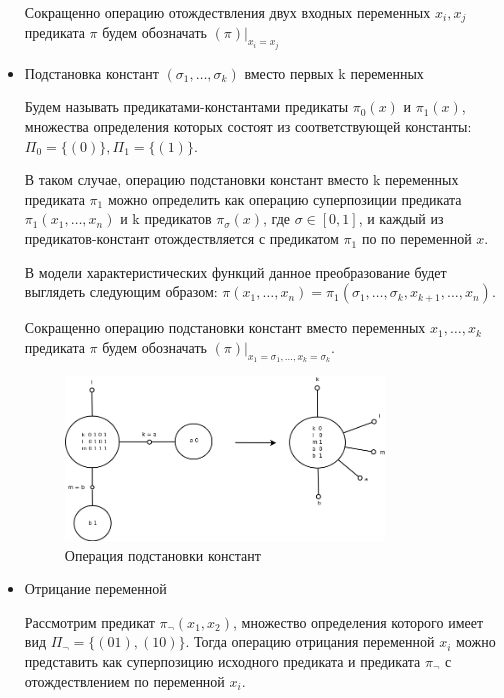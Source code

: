 \documentclass[12pt]{article}
\begin{document}
\begin{itemize}
    Сокращенно операцию отождествления двух входных переменных $x_i, x_j$ предиката $\pi$ будем обозначать 
    $(\pi)|_{x_i=x_j}$

    \item Подстановка констант $(\sigma_1, \dots, \sigma_k)$ вместо первых k переменных

    Будем называть предикатами-константами предикаты $\pi_0(x)$ и $\pi_1(x)$, множества определения которых состоят
    из соответствующей константы: $\Pi_0=\{ (0) \}, \Pi_1=\{ (1) \}$.

    В таком случае, операцию подстановки констант вместо k переменных предиката $\pi_1$ 
    можно определить как операцию суперпозиции предиката $\pi_1(x_1, \dots, x_n)$ и k предикатов 
    $\pi_{\sigma}(x)$, где $\sigma \in [0,1]$, и каждый из предикатов-констант отождествляется с предикатом $\pi_1$ по
    по переменной $x$.

    В модели характеристических функций данное преобразование будет выглядеть следующим образом:
    $\pi(x_1, \dots, x_n) = \pi_1(\sigma_1, \dots, \sigma_k, x_{k+1}, \dots, x_n)$. 
    
    Сокращенно операцию подстановки констант вместо переменных $x_1, \dots, x_k$ предиката $\pi$
    будем обозначать $(\pi)|_{x_1=\sigma_1, \dots, x_k=\sigma_k}$.

    \begin{figure}[htb]
    \centering
    \includegraphics[width=0.8\textwidth]{join_const_op.png}
    \caption{Операция подстановки констант}
    \label{fig:join_const_op}
    \samepage
    \end{figure}

    \item Отрицание переменной

    Рассмотрим предикат $\pi_{\neg}(x_1, x_2)$, множество определения которого имеет вид $\Pi_{\neg} = \{ (01), (10) \}$.
    Тогда операцию отрицания переменной $x_i$ можно представить как суперпозицию исходного предиката и предиката $\pi_{\neg}$
    с отождествлением по переменной $x_i$.
    

\end{itemize}
\end{document}
